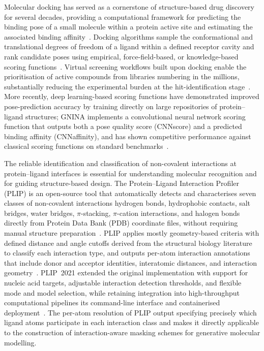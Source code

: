 \documentclass[a4paper,12pt]{article}
\begin{document}
Molecular docking has served as a cornerstone of structure-based drug
discovery for several decades, providing a computational framework for
predicting the binding pose of a small molecule within a protein active site
and estimating the associated binding affinity~\cite{Kitchen2004}.
Docking algorithms sample the conformational and translational degrees of
freedom of a ligand within a defined receptor cavity and rank candidate poses
using empirical, force-field-based, or knowledge-based scoring
functions~\cite{Kitchen2004}. Virtual screening workflows built upon docking enable the prioritisation of
active compounds from libraries numbering in the millions, substantially
reducing the experimental burden at the hit-identification
stage~\cite{Shoichet2004}.
More recently, deep learning-based scoring functions have demonstrated
improved pose-prediction accuracy by training directly on large repositories
of protein--ligand structures; GNINA implements a convolutional neural network
scoring function that outputs both a pose quality score (CNNscore) and a
predicted binding affinity (CNNaffinity), and has shown competitive
performance against classical scoring functions on standard
benchmarks~\cite{mcnunn2021gnina, Dunn2024CACHE}.

The reliable identification and classification of non-covalent interactions at
protein--ligand interfaces is essential for understanding molecular recognition
and for guiding structure-based design.
The Protein--Ligand Interaction Profiler (PLIP) is an open-source tool that
automatically detects and characterises seven classes of non-covalent
interactions hydrogen bonds, hydrophobic contacts, salt bridges, water
bridges, $\pi$-stacking, $\pi$-cation interactions, and halogen bonds
directly from Protein Data Bank (PDB) coordinate files, without requiring
manual structure preparation~\cite{salentin2015plip}.
PLIP applies mostly geometry-based criteria with defined distance and angle
cutoffs derived from the structural biology literature to classify each
interaction type, and outputs per-atom interaction annotations that include
donor and acceptor identities, interatomic distances, and interaction
geometry~\cite{salentin2015plip}.
PLIP~2021 extended the original implementation with support for nucleic acid
targets, adjustable interaction detection thresholds, and flexible mode and
model selection, while retaining integration into high-throughput
computational pipelines its command-line interface and containerised
deployment~\cite{Adasme2021}.
The per-atom resolution of PLIP output specifying precisely which ligand
atoms participate in each interaction class and makes it directly applicable
to the construction of interaction-aware masking schemes for generative
molecular modelling. 
\end{document}
